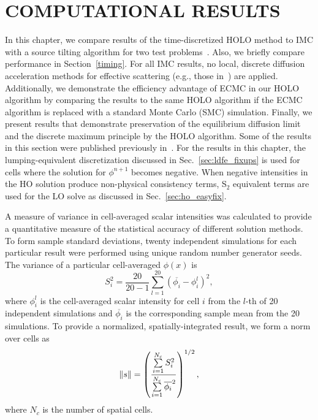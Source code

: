 
\chapter{\uppercase{Computational Results}}

In this chapter, we compare results of the time-discretized HOLO method to IMC with
a source tilting algorithm for two test problems~\cite{jayenne}.  Also, we
briefly compare performance in Section~\ref{timing}.  For all IMC results, no
local, discrete diffusion acceleration methods for effective scattering
(e.g., those in~\cite{imd,ddmc}) are applied.  Additionally, we demonstrate
the efficiency advantage of ECMC in our HOLO algorithm by comparing the results
to the same HOLO algorithm if the ECMC algorithm is replaced with a standard
Monte Carlo (SMC) simulation.  Finally, we present results that demonstrate
preservation of the equilibrium diffusion limit and the discrete maximum
principle by the HOLO algorithm.  Some of the results in this section were published
previously in~\cite{bolding_nse}.  
For the results in this chapter, the lumping-equivalent discretization
discussed in Sec.~\ref{sec:ldfe_fixups} is used for cells where the solution for
$\phi^{n+1}$ becomes negative.  When negative intensities in the HO solution produce
non-physical consistency terms, S$_2$ equivalent terms are used for the LO solve as
discussed in Sec.~\ref{sec:ho_easyfix}.

A measure of variance in cell-averaged scalar intensities was
calculated to provide a quantitative measure of the statistical accuracy of different solution
methods.  To form sample standard deviations, twenty independent simulations for each
particular result were performed using unique random number generator seeds.
The variance of a particular cell-averaged $\phi(x)$ is 
\begin{equation} 
    S_i^2 =  \frac{20}{20-1} \sum_{l=1}^{20} \left(\overline{\phi_{i}} -
    \phi_{i}^l\right)^2,
\end{equation}
where $\phi_{i}^l$ is the cell-averaged scalar intensity for cell $i$ from the $l$-th of 20 independent simulations and
$\overline{\phi_{i}}$ is the corresponding sample mean from the 20 simulations. To
provide a normalized, spatially-integrated result, we form a norm over cells as 
\begin{equation}
    \ss = \left({\frac{\sum\limits_{i=1}^{N_c}
S_i^2}{\sum\limits_{i=1}^{N_c}\overline{\phi_{i}}^2}}\right)^{1/2},
\end{equation}
where $N_c$ is the number of spatial cells. 

